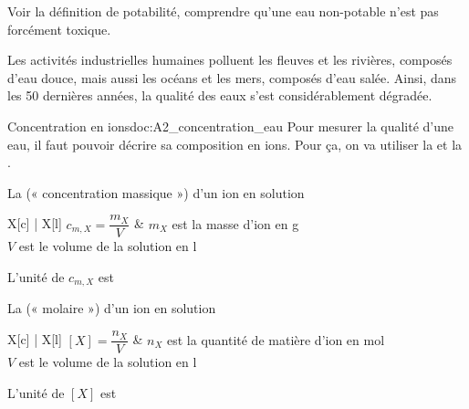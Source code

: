 \teteTermStssEnvi

\vspace*{-36pt}


\begin{objectifs}
  \item Voir la définition de potabilité, comprendre qu'une eau non-potable n'est pas forcément toxique.
\end{objectifs}

\begin{contexte}
  Les activités industrielles humaines polluent les fleuves et les rivières, composés d'eau douce, mais aussi les océans et les mers, composés d'eau salée.
  Ainsi, dans les 50 dernières années, la qualité des eaux s'est considérablement dégradée.
  
\end{contexte}


\begin{doc}{Concentration en ions}{doc:A2_concentration_eau}
  Pour mesurer la qualité d'une eau, il faut pouvoir décrire sa composition en ions.
  Pour ça, on va utiliser la 
  et la .

  \begin{importants}  
    La  (« concentration massique ») d'un ion en solution
    \begin{center}
      \begin{tblr}{X[c] | X[l]}
        $c_{m,X} = \dfrac{m_X}{V}$ &
        { $m_X$ est la masse d'ion en \unit{\g} \\
        $V$ est le volume de la solution en \unit{\litre} }
      \end{tblr}
    \end{center}
    L'unité de $c_{m,X}$ est \texteTrou[0.1]{\unit{\g\per\litre}}
  \end{importants}
  \begin{importants}  
    La  (« molaire ») d'un ion en solution
    \begin{center}
      \begin{tblr}{X[c] | X[l]}
        $[X] = \dfrac{n_X}{V}$ &
        { $n_X$ est la quantité de matière d'ion en \unit{\mole} \\
        $V$ est le volume de la solution en \unit{\litre} }
      \end{tblr}
    \end{center}
    L'unité de $[X]$ est \texteTrou[0.1]{\unit{\mole\per\litre}}
  \end{importants}
\end{doc}

